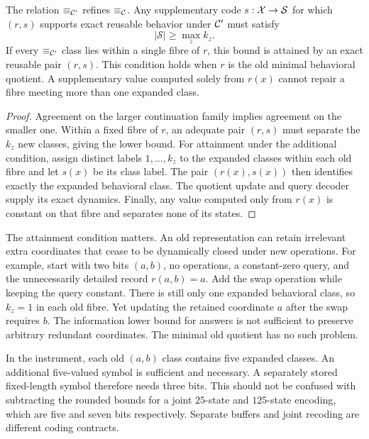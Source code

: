 \begin{MUproposition}\label{MU:prop:expansion}
The relation $\equiv_{\mathcal C'}$ refines $\equiv_{\mathcal C}$. Any supplementary code $s:\mathcal X\to\mathcal S$ for which $(r,s)$ supports exact reusable behavior under $\mathcal C'$ must satisfy
\[
|\mathcal S|\geq\max_z k_z.
\]
If every $\equiv_{\mathcal C'}$ class lies within a single fibre of $r$, this bound is attained by an exact reusable pair $(r,s)$. This condition holds when $r$ is the old minimal behavioral quotient. A supplementary value computed solely from $r(x)$ cannot repair a fibre meeting more than one expanded class.
\end{MUproposition}
\begin{proof}
Agreement on the larger continuation family implies agreement on the smaller one. Within a fixed fibre of $r$, an adequate pair $(r,s)$ must separate the $k_z$ new classes, giving the lower bound. For attainment under the additional condition, assign distinct labels $1,\ldots,k_z$ to the expanded classes within each old fibre and let $s(x)$ be its class label. The pair $(r(x),s(x))$ then identifies exactly the expanded behavioral class. The quotient update and query decoder supply its exact dynamics. Finally, any value computed only from $r(x)$ is constant on that fibre and separates none of its states.
\end{proof}

The attainment condition matters. An old representation can retain irrelevant extra coordinates that cease to be dynamically closed under new operations. For example, start with two bits $(a,b)$, no operations, a constant-zero query, and the unnecessarily detailed record $r(a,b)=a$. Add the swap operation while keeping the query constant. There is still only one expanded behavioral class, so $k_z=1$ in each old fibre. Yet updating the retained coordinate $a$ after the swap requires $b$. The information lower bound for answers is not sufficient to preserve arbitrary redundant coordinates. The minimal old quotient has no such problem.

In the instrument, each old $(a,b)$ class contains five expanded classes. An additional five-valued symbol is sufficient and necessary. A separately stored fixed-length symbol therefore needs three bits. This should not be confused with subtracting the rounded bounds for a joint $25$-state and $125$-state encoding, which are five and seven bits respectively. Separate buffers and joint recoding are different coding contracts.


